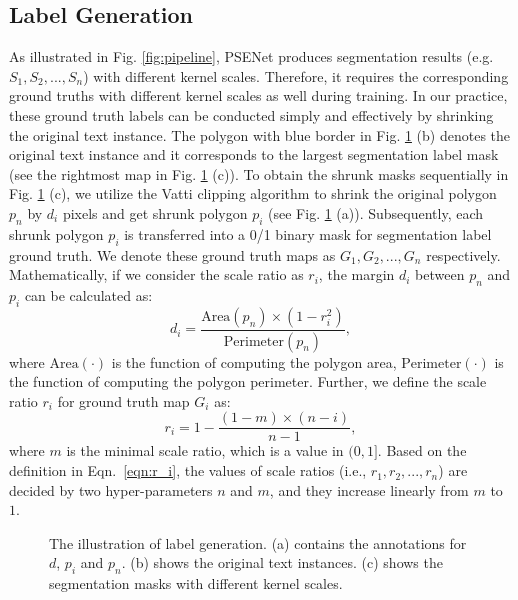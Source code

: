 \documentclass{article}
\begin{document}
\subsection{Label Generation}
\label{sec:label-gen}
As illustrated in Fig. \ref{fig:pipeline}, PSENet produces segmentation results (e.g. $S_1, S_2, ..., S_n$) with different kernel scales. Therefore, it requires the corresponding ground truths with different kernel scales as well during training. In our practice, these ground truth labels can be conducted simply and effectively by shrinking the original text instance.
The polygon with blue border in Fig. \ref{fig:label_gen} (b) denotes the original text instance and it corresponds to the largest segmentation label mask (see the rightmost map in Fig. \ref{fig:label_gen} (c)). To obtain the shrunk masks sequentially in Fig. \ref{fig:label_gen} (c), we utilize the Vatti clipping algorithm \cite{vatti1992generic} to shrink the original polygon $p_n$ by $d_i$ pixels and get shrunk polygon $p_i$ (see Fig. \ref{fig:label_gen} (a)). Subsequently, each shrunk polygon $p_i$ is transferred into a 0/1 binary mask for segmentation label ground truth. We denote these ground truth maps as $G_1, G_2, ..., G_n$ respectively. Mathematically, if we consider the scale ratio as $r_i$, the margin $d_i$ between $p_n$ and $p_i$ can be calculated as:
\begin{equation}
	d_i = \frac{\mbox{Area}(p_n) \times (1 - r_i^2)}{\mbox{Perimeter}(p_n)},
	\label{eqn:d_i}
\end{equation}
where $\mbox{Area}(\cdot)$ is the function of computing the polygon area, $\mbox{Perimeter}(\cdot)$ is the function of computing the polygon perimeter. Further, we define the scale ratio $r_i$ for ground truth map $G_i$ as:
\begin{equation}
	r_i = 1 - \frac{(1 - m) \times (n - i)}{n - 1},
	\label{eqn:r_i}
\end{equation}
where $m$ is the minimal scale ratio, which is a value in $(0, 1]$. Based on the definition in Eqn.~\eqref{eqn:r_i}, the values of scale ratios (i.e., $r_1, r_2, ..., r_n$) are decided by two hyper-parameters $n$ and $m$, and they increase linearly from $m$ to $1$.



\begin{figure}[t]
  \centering
  \setlength{\fboxrule}{0pt}
  \vspace{-8pt}
  \caption{The illustration of label generation. (a) contains the annotations for $d$, $p_i$ and $p_n$. (b) shows the original text instances. (c) shows the segmentation masks with different kernel scales.}
  \label{fig:label_gen}

\end{figure}
\end{document}
